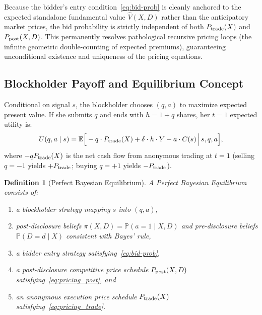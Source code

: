 \documentclass[11pt]{article}
\newtheorem{definition}{Definition}
\newcommand{\E}{\mathbb{E}}
\newcommand{\PP}{\mathbb{P}}
\newcommand{\1}{\mathbf{1}}
\begin{document}
Because the bidder's entry condition~\eqref{eq:bid-prob} is cleanly anchored to the expected standalone fundamental value $\hat{V}(X,D)$ rather than the anticipatory market prices, the bid probability is strictly independent of both $P_{\textup{trade}}(X)$ and $P_{\textup{post}}(X,D)$. This permanently resolves pathological recursive pricing loops (the infinite geometric double-counting of expected premiums), guaranteeing unconditional existence and uniqueness of the pricing equations.

%
\subsection{Blockholder Payoff and Equilibrium Concept}

Conditional on signal $s$, the blockholder chooses $(q, a)$ to maximize expected present value. If she submits $q$ and ends with $h = 1 + q$ shares, her $t = 1$ expected utility is:
\[
U(q, a \mid s) = \E\Big[-q \cdot P_{\textup{trade}}(X) + \delta \cdot h \cdot Y - a \cdot C(s) \,\Big|\, s, q, a\Big],
\]
where $-qP_{\textup{trade}}(X)$ is the net cash flow from anonymous trading at $t = 1$ (selling $q = -1$ yields $+P_{\textup{trade}}$; buying $q = +1$ yields $-P_{\textup{trade}}$).

\begin{definition}[Perfect Bayesian Equilibrium]
A \emph{Perfect Bayesian Equilibrium} consists of:
\begin{enumerate}[label=(\roman{enumi})]
\item a blockholder strategy mapping $s$ into $(q, a)$,
\item post-disclosure beliefs $\pi(X,D) = \PP(a = 1 \mid X, D)$ and pre-disclosure beliefs $\PP(D=d \mid X)$ consistent with Bayes' rule,
\item a bidder entry strategy satisfying~\eqref{eq:bid-prob},
\item a post-disclosure competitive price schedule $P_{\textup{post}}(X,D)$ satisfying~\eqref{eq:pricing_post}, and
\item an anonymous execution price schedule $P_{\textup{trade}}(X)$ satisfying~\eqref{eq:pricing_trade}.
\end{enumerate}
\end{definition}
\end{document}
